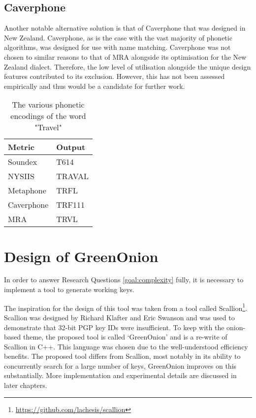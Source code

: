 \subsection{Caverphone}
Another notable alternative solution is that of Caverphone that was designed in New Zealand. Caverphone, as is the case with the vast majority of phonetic algorithms, was designed for use with name matching. Caverphone was not chosen to similar reasons to that of MRA alongside its optimisation for the New Zealand dialect. Therefore, the low level of utilisation alongside the unique design features contributed to its exclusion. However, this has not been assessed empirically and thus would be a candidate for further work.

\begin{table}[h!]
    \centering
    \begin{tabular}{ll}
        Metric & Output \\
        \hline    
        Soundex & T614 \\
        NYSIIS & TRAVAL\\
        Metaphone & TRFL\\
        Caverphone & TRF111\\
        MRA & TRVL
    \end{tabular}
    \caption{The various phonetic encodings of the word "Travel"}
\end{table}

\section{Design of GreenOnion}
\label{sec:greenDesign}
In order to answer Research Questions \ref{goal:complexity} fully, it is necessary to implement a tool to generate working keys. 

The inspiration for the design of this tool was taken from a tool called Scallion\footnote{\url{https://github.com/lachesis/scallion}}. Scallion was designed by Richard Klafter and Eric Swanson and was used to demonstrate that 32-bit PGP key IDs were insufficient. To keep with the onion-based theme, the proposed tool is called `GreenOnion' and is a re-write of Scallion in C++. This language was chosen due to the well-understood efficiency benefits. The proposed tool differs from Scallion, most notably in its ability to concurrently search for a large number of keys, GreenOnion improves on this substantially. More implementation and experimental details are discussed in later chapters.


